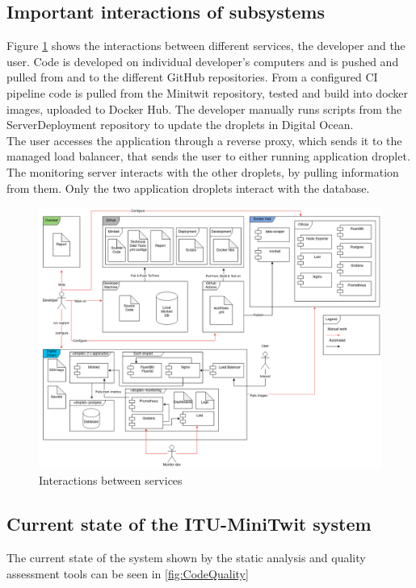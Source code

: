 \subsection{Important interactions of subsystems}
Figure \ref{fig:interactions} shows the interactions between different services, the developer and the user. Code is developed on individual developer's computers and is pushed and pulled from and to the different GitHub repositories. From a configured CI pipeline code is pulled from the Minitwit repository, tested and build into docker images, uploaded to Docker Hub. The developer manually runs scripts from the ServerDeployment repository to update the droplets in Digital Ocean.\\
The user accesses the application through a reverse proxy, which sends it to the managed load balancer, that sends the user to either running application droplet.\\
The monitoring server interacts with the other droplets, by pulling information from them. Only the two application droplets interact with the database.
\begin{figure}[H]
    \centering
    \includegraphics[width=\linewidth]{images/diagrams/Interactions.png}
    \caption{Interactions between services}
    \label{fig:interactions}
\end{figure}


\subsection{Current state of the ITU-MiniTwit system}
The current state of the system shown by the static analysis and quality assessment tools can be seen in \autoref{fig:CodeQuality}

